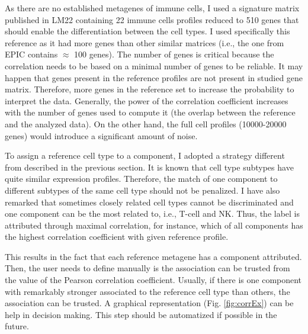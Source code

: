\documentclass[12pt,]{book}
\theoremstyle{definition}
\theoremstyle{definition}
\theoremstyle{definition}
\theoremstyle{remark}
\begin{document}
As there are no established metagenes of immune cells, I used a
signature matrix published in \citep{Newman2015} LM22 containing 22
immune cells profiles reduced to 510 genes that should enable the
differentiation between the cell types. I used specifically this
reference as it had more genes than other similar matrices (i.e., the
one from EPIC \citep{Racle2017} contains \(\approx\) 100 genes). The
number of genes is critical because the correlation needs to be based on
a minimal number of genes to be reliable. It may happen that genes
present in the reference profiles are not present in studied gene
matrix. Therefore, more genes in the reference set to increase the
probability to interpret the data. Generally, the power of the
correlation coefficient increases with the number of genes used to
compute it (the overlap between the reference and the analyzed data). On
the other hand, the full cell profiles (10000-20000 genes) would
introduce a significant amount of noise.

To assign a reference cell type to a component, I adopted a strategy
different from described in the previous section. It is known that cell
type subtypes have quite similar expression profiles. Therefore, the
match of one component to different subtypes of the same cell type
should not be penalized. I have also remarked that sometimes closely
related cell types cannot be discriminated and one component can be the
most related to, i.e., T-cell and NK. Thus, the label is attributed
through maximal correlation, for instance, which of all components has
the highest correlation coefficient with given reference profile.

This results in the fact that each reference metagene has a component
attributed. Then, the user needs to define manually is the association
can be trusted from the value of the Pearson correlation coefficient.
Usually, if there is one component with remarkably stronger associated
to the reference cell type than others, the association can be trusted.
A graphical representation (Fig. \ref{fig:corrEx}) can be help in
decision making. This step should be automatized if possible in the
future.
\end{document}
